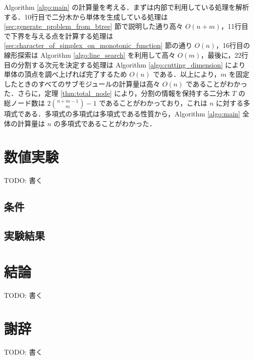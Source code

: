 \documentclass[a4paper,11pt]{jreport}
\begin{document}
Algorithm \ref{algo:main} の計算量を考える．まずは内部で利用している処理を解析する．10行目で二分木から単体を生成している処理は \ref{sec:generate_problem_from_btree} 節で説明した通り高々 $ O(n + m) $，11行目で下界を与える点を計算する処理は \ref{sec:character_of_simplex_on_monotonic_function} 節の通り $ O(n) $，16行目の線形探索は Algorithm \ref{algo:line_search} を利用して高々 $ O(m) $，最後に，22行目の分割する次元を決定する処理は Algorithm \ref{algo:cutting_dimension} により単体の頂点を調べ上げれば完了するため $ O(n) $ である．以上により，$ m $ を固定したときのすべてのサブモジュールの計算量は高々 $ O(n) $ であることがわかった．さらに，定理 \ref{thm:total_node} により，分割の情報を保持する二分木 $ T $ の総ノード数は $ 2 \binom{n + m - 1}{m} - 1 $ であることがわかっており，これは $ n $ に対する多項式である．多項式の多項式は多項式である性質から，Algorithm \ref{algo:main} 全体の計算量は $ n $ の多項式であることがわかった．\par

\chapter{数値実験}

TODO: 書く
\section{条件}
\section{実験結果}

\chapter{結論}

TODO: 書く

\chapter*{謝辞}

TODO: 書く

\newpage

\renewcommand{\bibname}{参考文献}
\end{document}
